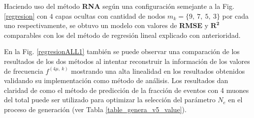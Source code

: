 Haciendo uso del método \textbf{RNA} según una configuración semejante a la Fig. \ref{regresion} con $4$ capas ocultas con cantidad de nodos $m_k=\{9,~7,~5,~3\}$ por cada uno respectivamente, se obtuvo un modelo con valores de \textbf{RMSE} y $\mathbf{R^2}$ comparables con los del método de regresión lineal explicado con anterioridad.

En la Fig. \ref{regresionALL1} también se puede observar una comparación de los resultados de los dos métodos al intentar reconstruir la información de los valores de frecuencia $f^{(4\mu,~k)}$ mostrando una alta linealidad en los resultados obtenidos validando su implementación como método de análisis. Los resultados dan claridad de como el método de predicción de la fracción de eventos con 4 muones del total puede ser utilizado para optimizar la selección del parámetro $N_e$ en el proceso de generación (ver Tabla \ref{table_genera_v5_value}).


%



